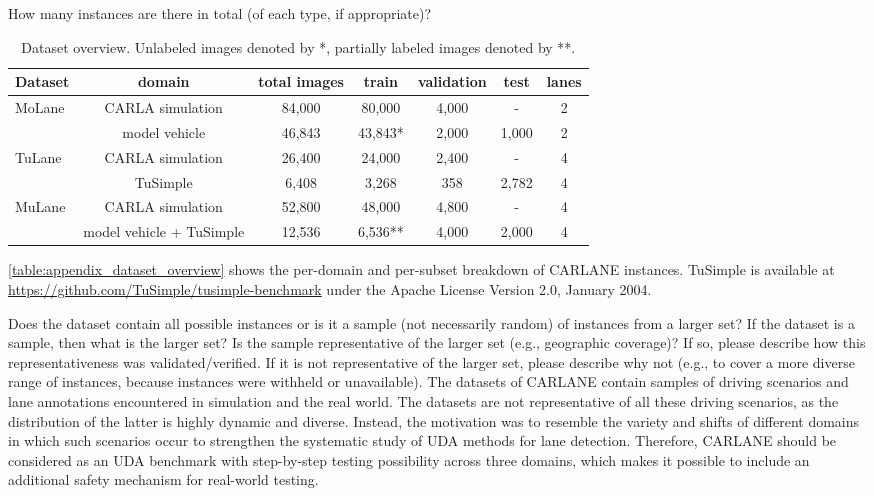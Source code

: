 \documentclass{article}
\begin{document}
	\begin{datasheetitem}{How many instances are there in total (of each type, if appropriate)?}
		\begin{table*}
			\caption{Dataset overview. Unlabeled images denoted by *, partially labeled images denoted by **.}
			\label{table:appendix_dataset_overview}
			\small
			\centering
			\begin{tabular}{lcccccc}
				\toprule
				Dataset                  & domain             & total images & train   & validation  & test  & lanes       \\ \midrule
				\multirow{2}{*}{MoLane}  & CARLA simulation   & 84,000       & 80,000  & 4,000       & -     &  2  \\ 
				& model vehicle      & 46,843       & 43,843* & 2,000       & 1,000 &  2  \\ \midrule
				\multirow{2}{*}{TuLane}  & CARLA simulation   & 26,400       & 24,000  & 2,400       & -     &  4  \\ 
				& TuSimple & 6,408        & 3,268   & 358         & 2,782 &  4  \\ \midrule
				\multirow{2}{*}{MuLane}  & CARLA simulation   & 52,800       & 48,000  & 4,800       & -     &  4  \\ 
				& model vehicle + TuSimple & 12,536      & 6,536** & 4,000       & 2,000 &  4  \\ 
				\bottomrule
			\end{tabular}
		\end{table*}
		\autoref{table:appendix_dataset_overview} shows the per-domain and per-subset breakdown of CARLANE instances. TuSimple is available at  \url{https://github.com/TuSimple/tusimple-benchmark} under the Apache License Version 2.0, January 2004. 
	\end{datasheetitem}
	\begin{datasheetitem}{Does the dataset contain all possible instances or is it a sample (not necessarily random) of instances from a larger set? \normalfont If the dataset is a sample, then what is the larger set? Is the sample representative of the larger set (e.g., geographic coverage)? If so, please describe how this representativeness was validated/verified. If it is not representative of the larger set, please describe why not (e.g., to cover a more diverse range of instances, because instances were withheld or unavailable).}
		The datasets of CARLANE contain samples of driving scenarios and lane annotations encountered in simulation and the real world. The datasets are not representative of all these driving scenarios, as the distribution of the latter is highly dynamic and diverse. Instead, the motivation was to resemble the variety and shifts of different domains in which such scenarios occur to strengthen the systematic study of UDA methods for lane detection. Therefore, CARLANE should be considered as an UDA benchmark with step-by-step testing possibility across three domains, which makes it possible to include an additional safety mechanism for real-world testing.
	\end{datasheetitem}
\end{document}
